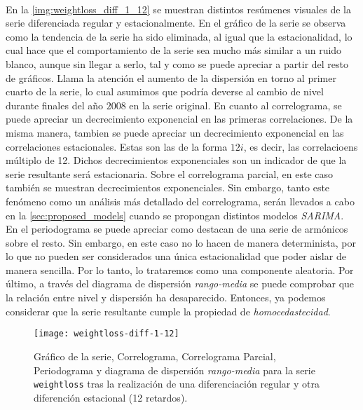 \documentclass[a4paper, spanish]{article}
\begin{document}
        \paragraph{}
        En la \autoref{img:weightloss_diff_1_12} se muestran distintos resúmenes visuales de la serie diferenciada regular y estacionalmente. En el gráfico de la serie se observa como la tendencia de la serie ha sido eliminada, al igual que la estacionalidad, lo cual hace que el comportamiento de la serie sea mucho más similar a un ruido blanco, aunque sin llegar a serlo, tal y como se puede apreciar a partir del resto de gráficos. Llama la atención el aumento de la dispersión en torno al primer cuarto de la serie, lo cual asumimos que podría deverse al cambio de nivel durante finales del año $2008$ en la serie original. En cuanto al correlograma, se puede apreciar un decrecimiento exponencial en las primeras correlaciones. De la misma manera, tambien se puede apreciar un decrecimiento exponencial en las correlaciones estacionales. Estas son las de la forma $12i$, es decir, las correlacioens múltiplo de 12. Dichos decrecimientos exponenciales son un indicador de que la serie resultante será estacionaria. Sobre el correlograma parcial, en este caso también se muestran decrecimientos exponenciales. Sin embargo, tanto este fenómeno como un análisis más detallado del correlograma, serán llevados a cabo en la \autoref{sec:proposed_models} cuando se propongan distintos modelos \emph{SARIMA}. En el periodograma se puede apreciar como destacan de una serie de armónicos sobre el resto. Sin embargo, en este caso no lo hacen de manera determinista, por lo que no pueden ser considerados una única estacionalidad que poder aislar de manera sencilla. Por lo tanto, lo trataremos como una componente aleatoria. Por último, a través del diagrama de dispersión \emph{rango-media} se puede comprobar que la relación entre nivel y dispersión ha desaparecido. Entonces, ya podemos considerar que la serie resultante cumple la propiedad de \emph{homocedastecidad}.

        \begin{figure}[htb!]
          \texttt{[image: weightloss-diff-1-12]}
          \caption{Gráfico de la serie, Correlograma, Correlograma Parcial, Periodograma y diagrama de dispersión \emph{rango-media} para la serie \texttt{weightloss} tras la realización de una diferenciación regular y otra diferención estacional (12 retardos).}
          \label{img:weightloss_diff_1_12}
        \end{figure}
\end{document}

